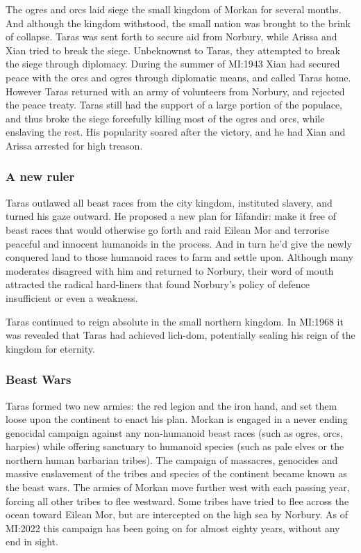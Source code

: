 The ogres and orcs laid siege the small kingdom of Morkan for several
months. And although the kingdom withstood, the small nation was brought to
the brink of collapse. Taras was sent forth to secure aid from Norbury, while
Arissa and Xian tried to break the siege. Unbeknownst to Taras, they attempted
to break the siege through diplomacy. During the summer of MI:1943 Xian
had secured peace with the orcs and ogres through diplomatic means, and
called Taras home. However Taras returned with an army of volunteers from
Norbury, and rejected the peace treaty. Taras still had the support of a large
portion of the populace, and thus broke the siege forcefully killing most of the
ogres and orcs, while enslaving the rest. His popularity soared after the
victory, and he had Xian and Arissa arrested for high treason.

\subsubsection{A new ruler}

Taras outlawed all beast races from the city kingdom, instituted slavery,
and turned his gaze outward. He proposed a new plan for Iâfandir: make it free
of beast races that would otherwise go forth and raid Eilean Mor and terrorise
peaceful and innocent humanoids in the process. And in turn he'd give the newly
conquered land to those humanoid races to farm and settle upon. Although many
moderates disagreed with him and returned to Norbury, their word of mouth
attracted the radical hard-liners that found Norbury's policy of defence
insufficient or even a weakness.

Taras continued to reign absolute in the small northern kingdom. In MI:1968 it
was revealed that Taras had achieved lich-dom, potentially sealing his reign
of the kingdom for eternity.

\subsubsection{Beast Wars}
\label{sec:Beast Wars}

Taras formed two new armies: the red legion and the iron hand, and set them
loose upon the continent to enact his plan. Morkan is engaged in a never
ending genocidal campaign against any non-humanoid beast races (such as ogres,
orcs, harpies) while offering sanctuary to humanoid species (such as pale
elves or the northern human barbarian tribes). The campaign of massacres,
genocides and massive enslavement of the tribes and species of the continent
became known as the beast wars. The armies of Morkan move further west with
each passing year, forcing all other tribes to flee westward. Some tribes have
tried to flee across the ocean toward Eilean Mor, but are intercepted
on the high sea by Norbury. As of MI:2022 this campaign has been going on for
almost eighty years, without any end in sight.

